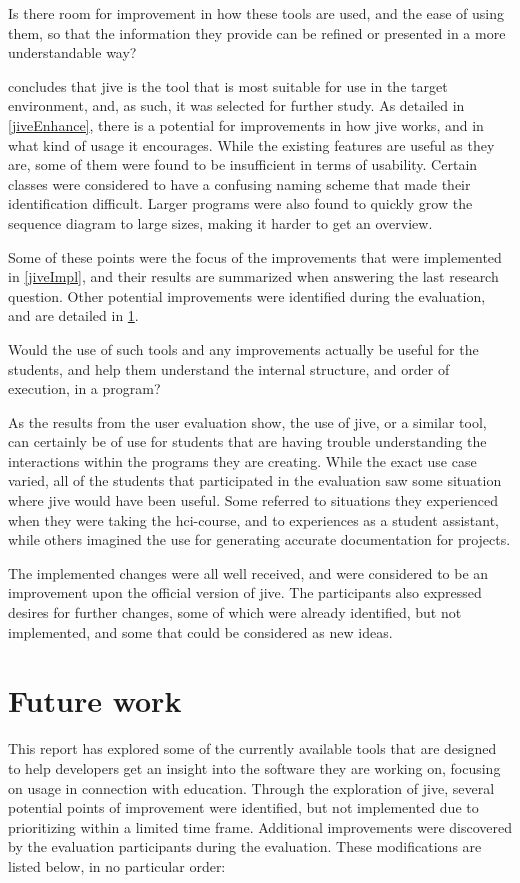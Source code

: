 \begin{theorem}
Is there room for improvement in how these tools are used, and the ease of using them, so that the information they provide can be refined or presented in a more understandable way?
\end{theorem}
 concludes that \gls{jive} is the tool that is most suitable for use in the target environment, and, as such, it was selected for further study.
As detailed in \cref{jiveEnhance}, there is a potential for improvements in how \gls{jive} works, and in what kind of usage it encourages.
While the existing features are useful as they are, some of them were found to be insufficient in terms of usability.
Certain classes were considered to have a confusing naming scheme that made their identification difficult.
Larger programs were also found to quickly grow the sequence diagram to large sizes, making it harder to get an overview.

Some of these points were the focus of the improvements that were implemented in \cref{jiveImpl}, and their results are summarized when answering the last research question.
Other potential improvements were identified during the evaluation, and are detailed in \cref{conclusionFuture}.

\begin{theorem}
Would the use of such tools and any improvements actually be useful for the students, and help them understand the internal structure, and order of execution, in a program?
\end{theorem}
As the results from the user evaluation show, the use of \gls{jive}, or a similar tool, can certainly be of use for students that are having trouble understanding the interactions within the programs they are creating.
While the exact use case varied, all of the students that participated in the evaluation saw some situation where \gls{jive} would have been useful.
Some referred to situations they experienced when they were taking the \gls{hci}-course, and to experiences as a student assistant, while others imagined the use for generating accurate documentation for projects.

The implemented changes were all well received, and were considered to be an improvement upon the official version of \gls{jive}.
The participants also expressed desires for further changes, some of which were already identified, but not implemented, and some that could be considered as new ideas.

\section{Future work}\label{conclusionFuture}
This report has explored some of the currently available tools that are designed to help developers get an insight into the software they are working on, focusing on usage in connection with education.
Through the exploration of \gls{jive}, several potential points of improvement were identified, but not implemented due to prioritizing within a limited time frame.
Additional improvements were discovered by the evaluation participants during the evaluation.
These modifications are listed below, in no particular order:

